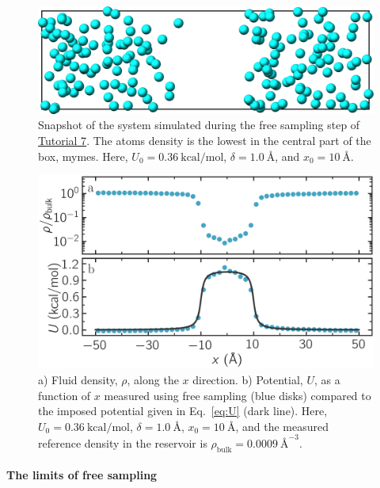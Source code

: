 \documentclass[9pt,tutorial]{livecoms}
\newcommand{\lmpcmd}[1]{\hspace{0pt}\colorbox{listing}{\textcolor{command}{\small{#1}}}\hspace{0pt}} %
\begin{document}
\begin{figure}
\centering
\includegraphics[width=\linewidth]{US-system-unbiased}
\caption{Snapshot of the system simulated during the free sampling
step of \hyperref[umbrella-sampling-label]{Tutorial 7}.
The atoms density is the lowest in the central
part of the box, \lmpcmd{mymes}.  Here,
$U_0 = 0.36~\text{kcal/mol}$, $\delta = 1.0~\text{\AA{}}$, and $x_0 = 10~\text{\AA{}}$.}
\label{fig:US-system-unbiased}
\end{figure}

\begin{figure}
\centering
\includegraphics[width=\linewidth]{US-density}
\caption{a) Fluid density, $\rho$, along the $x$ direction.
b) Potential, $U$, as a function of $x$ measured using free sampling (blue disks)
compared to the imposed potential given in Eq.~\eqref{eq:U} (dark line).
Here, $U_0 = 0.36~\text{kcal/mol}$, $\delta = 1.0~\text{\AA{}}$, $x_0 = 10~\text{\AA{}}$,
and the measured reference density in the reservoir is $\rho_\text{bulk} = 0.0009~\text{\AA{}}^{-3}$.} %
\label{fig:US-density}
\end{figure}

\paragraph{The limits of free sampling}
\end{document}

